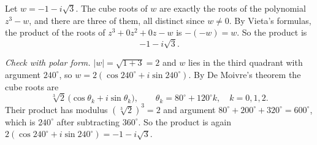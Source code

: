 Let $w=-1-i\sqrt3$. The cube roots of $w$ are exactly the roots of the polynomial $z^3-w$, and there are three of them, all distinct since $w\ne0$. By Vieta's formulas, the product of the roots of $z^3+0z^2+0z-w$ is $-(-w)=w$. So the product is
\[\boxed{-1-i\sqrt3}.\]

\emph{Check with polar form.} $|w|=\sqrt{1+3}=2$ and $w$ lies in the third quadrant with argument $240^\circ$, so $w=2(\cos240^\circ+i\sin240^\circ)$. By De Moivre's theorem the cube roots are
\[\sqrt[3]{2}\,\bigl(\cos\theta_k+i\sin\theta_k\bigr),\qquad\theta_k=80^\circ+120^\circ k,\quad k=0,1,2.\]
Their product has modulus $\left(\sqrt[3]{2}\right)^3=2$ and argument $80^\circ+200^\circ+320^\circ=600^\circ$, which is $240^\circ$ after subtracting $360^\circ$. So the product is again $2(\cos240^\circ+i\sin240^\circ)=-1-i\sqrt3$.
